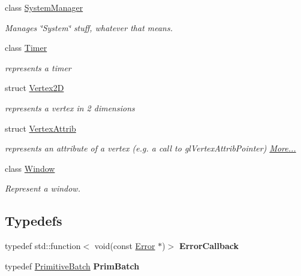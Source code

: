 \begin{DoxyCompactItemize}
\item 
class \hyperlink{classnta_1_1SystemManager}{System\+Manager}
\begin{DoxyCompactList}\small\item\em Manages \char`\"{}\+System\char`\"{} stuff, whatever that means. \end{DoxyCompactList}\item 
class \hyperlink{classnta_1_1Timer}{Timer}
\begin{DoxyCompactList}\small\item\em represents a timer \end{DoxyCompactList}\item 
struct \hyperlink{structnta_1_1Vertex2D}{Vertex2D}
\begin{DoxyCompactList}\small\item\em represents a vertex in 2 dimensions \end{DoxyCompactList}\item 
struct \hyperlink{namespacenta_df/d9d/structnta_1_1VertexAttrib}{Vertex\+Attrib}
\begin{DoxyCompactList}\small\item\em represents an attribute of a vertex (e.\+g. a call to gl\+Vertex\+Attrib\+Pointer)  \hyperlink{namespacenta_df/d9d/structnta_1_1VertexAttrib}{More...}\end{DoxyCompactList}\item 
class \hyperlink{classnta_1_1Window}{Window}
\begin{DoxyCompactList}\small\item\em Represent a window. \end{DoxyCompactList}\end{DoxyCompactItemize}
\subsection*{Typedefs}
\begin{DoxyCompactItemize}
\item 
\mbox{\label{namespacenta_a1f5715ee41c7a9174d2cc404fdb8556a}} 
typedef std\+::function$<$ void(const \hyperlink{structnta_1_1Error}{Error} $\ast$)$>$ {\bfseries Error\+Callback}
\item 
\mbox{\label{namespacenta_acee44e1bbf4f2431ec51a26e231691e5}} 
typedef \hyperlink{classnta_1_1PrimitiveBatch}{Primitive\+Batch} {\bfseries Prim\+Batch}
\end{DoxyCompactItemize}
